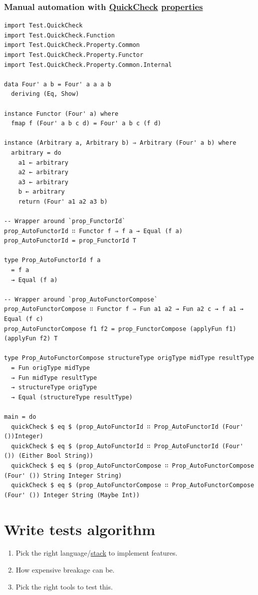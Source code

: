 \documentclass[a4paper,14pt,oneside]{book}
\begin{document}
\subsubsection{Manual automation with \hyperref[org7a8d4a0]{QuickCheck} \hyperref[org1feb373]{properties}}
\label{sec:orge07e7ea}

\begin{verbatim}
import Test.QuickCheck
import Test.QuickCheck.Function
import Test.QuickCheck.Property.Common
import Test.QuickCheck.Property.Functor
import Test.QuickCheck.Property.Common.Internal

data Four' a b = Four' a a a b
  deriving (Eq, Show)

instance Functor (Four' a) where
  fmap f (Four' a b c d) = Four' a b c (f d)

instance (Arbitrary a, Arbitrary b) ⇒ Arbitrary (Four' a b) where
  arbitrary = do
    a1 ← arbitrary
    a2 ← arbitrary
    a3 ← arbitrary
    b ← arbitrary
    return (Four' a1 a2 a3 b)

-- Wrapper around `prop_FunctorId`
prop_AutoFunctorId ∷ Functor f ⇒ f a → Equal (f a)
prop_AutoFunctorId = prop_FunctorId T

type Prop_AutoFunctorId f a
  = f a
  → Equal (f a)

-- Wrapper around `prop_AutoFunctorCompose`
prop_AutoFunctorCompose ∷ Functor f ⇒ Fun a1 a2 → Fun a2 c → f a1 → Equal (f c)
prop_AutoFunctorCompose f1 f2 = prop_FunctorCompose (applyFun f1) (applyFun f2) T

type Prop_AutoFunctorCompose structureType origType midType resultType
  = Fun origType midType
  → Fun midType resultType
  → structureType origType
  → Equal (structureType resultType)

main = do
  quickCheck $ eq $ (prop_AutoFunctorId ∷ Prop_AutoFunctorId (Four' ())Integer)
  quickCheck $ eq $ (prop_AutoFunctorId ∷ Prop_AutoFunctorId (Four' ()) (Either Bool String))
  quickCheck $ eq $ (prop_AutoFunctorCompose ∷ Prop_AutoFunctorCompose (Four' ()) String Integer String)
  quickCheck $ eq $ (prop_AutoFunctorCompose ∷ Prop_AutoFunctorCompose (Four' ()) Integer String (Maybe Int))
\end{verbatim}

\section{Write tests algorithm}
\label{sec:org54c7743}

\begin{enumerate}
\item Pick the right language/\hyperref[org65341ae]{stack} to implement features.\\
\item How expensive breakage can be.\\
\item Pick the right tools to test this.\\
\end{enumerate}
\end{document}
